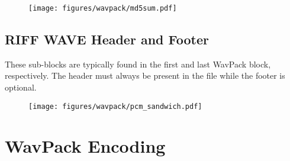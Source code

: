 \begin{figure}[h]
\texttt{[image: figures/wavpack/md5sum.pdf]}
\end{figure}

\subsection{RIFF WAVE Header and Footer}

These sub-blocks are typically found in the first and last
WavPack block, respectively.
The header must always be present in the file while
the footer is optional.

\begin{figure}[h]
\texttt{[image: figures/wavpack/pcm\_sandwich.pdf]}
\end{figure}

\clearpage

\section{WavPack Encoding}

